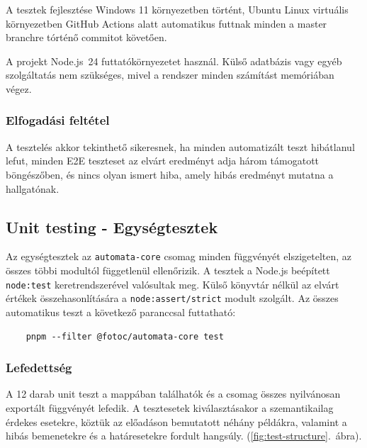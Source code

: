 A tesztek fejlesztése Windows 11 környezetben történt,
Ubuntu Linux virtuális környezetben GitHub Actions alatt automatikus futtnak minden a master branchre tórténő commitot követően.

 A projekt Node.js~24 futtatókörnyezetet használ. 
 Külső adatbázis vagy egyéb szolgáltatás nem szükséges, 
 mivel a rendszer minden számítást memóriában végez.
  


\subsubsection{Elfogadási feltétel}

A tesztelés akkor tekinthető sikeresnek, ha minden automatizált teszt
hibátlanul lefut, minden E2E teszteset az elvárt eredményt adja
három támogatott böngészőben, és nincs olyan ismert hiba, amely hibás
eredményt mutatna a hallgatónak. 

\subsection{ Unit testing - Egységtesztek}

Az egységtesztek  az \texttt{automata-core} csomag minden
függvényét elszigetelten, az összes többi modultól függetlenül
ellenőrizik. A tesztek a Node.js beépített \texttt{node:test}
keretrendszerével valósultak meg.
Külső könyvtár nélkül az elvárt értékek
összehasonlítására a \texttt{node:assert/strict} modult szolgált.
 Az összes automatikus teszt a következő paranccsal futtatható: 
 \begin{verbatim} 
    pnpm --filter @fotoc/automata-core test 
\end{verbatim}

\subsubsection*{Lefedettség}
A 12 darab unit teszt a  mappában találhatók
és a csomag összes nyilvánosan exportált
függvényét lefedik. A tesztesetek kiválasztásakor a szemantikailag
érdekes esetekre, köztük az előadáson bemutatott néhány
példákra, valamint a hibás bemenetekre és a határesetekre fordult hangsúly.
(\ref{fig:test-structure}.~ábra).

